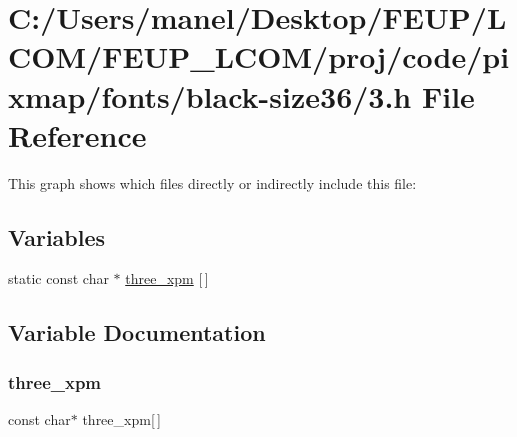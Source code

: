 \hypertarget{black-size36_23_8h}{}\section{C\+:/\+Users/manel/\+Desktop/\+F\+E\+U\+P/\+L\+C\+O\+M/\+F\+E\+U\+P\+\_\+\+L\+C\+O\+M/proj/code/pixmap/fonts/black-\/size36/3.h File Reference}
\label{black-size36_23_8h}
This graph shows which files directly or indirectly include this file\+:
\subsection*{Variables}
\begin{DoxyCompactItemize}
\item 
static const char $\ast$ \mbox{\hyperlink{black-size36_23_8h_a195f7a2eaa7c6017d7b0dda4d237d71e}{three\+\_\+xpm}} \mbox{[}$\,$\mbox{]}
\end{DoxyCompactItemize}


\subsection{Variable Documentation}
\mbox{\label{black-size36_23_8h_a195f7a2eaa7c6017d7b0dda4d237d71e}} 
\subsubsection{\texorpdfstring{three\_xpm}{three\_xpm}}
{\footnotesize\ttfamily const char$\ast$ three\+\_\+xpm\mbox{[}$\,$\mbox{]}\hspace{0.3cm}{\ttfamily [static]}}

